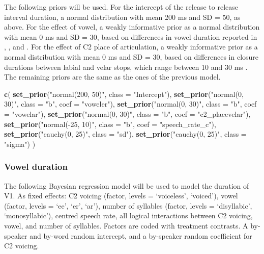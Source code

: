 \documentclass[11pt,]{article}
\newenvironment{Shaded}{\begin{snugshade}}{\end{snugshade}}
\newcommand{\KeywordTok}[1]{\textcolor[rgb]{0.13,0.29,0.53}{\textbf{#1}}}
\newcommand{\DataTypeTok}[1]{\textcolor[rgb]{0.13,0.29,0.53}{#1}}
\newcommand{\StringTok}[1]{\textcolor[rgb]{0.31,0.60,0.02}{#1}}
\newcommand{\NormalTok}[1]{#1}
\begin{document}
The following priors will be used. For the intercept of the release to
release interval duration, a normal distribution with mean 200 ms and SD
= 50, as above. For the effect of vowel, a weakly informative prior as a
normal distribution with mean 0 ms and SD = 30, based on differences in
vowel duration reported in \citet{heffner1937}, \citet{house1953}, and
\citet{hertrich1997}. For the effect of C2 place of articulation, a
weakly informative prior as a normal distribution with mean 0 ms and SD
= 30, based on differences in closure durations between labial and velar
stops, which range between 10 and 30 ms \citep{sharf1962}. The remaining
priors are the same as the ones of the previous model.

\begin{Shaded}
\begin{Highlighting}[]
\KeywordTok{c}\NormalTok{(}
  \KeywordTok{set_prior}\NormalTok{(}\StringTok{"normal(200, 50)"}\NormalTok{, }\DataTypeTok{class =} \StringTok{"Intercept"}\NormalTok{),}
  \KeywordTok{set_prior}\NormalTok{(}\StringTok{"normal(0, 30)"}\NormalTok{, }\DataTypeTok{class =} \StringTok{"b"}\NormalTok{, }\DataTypeTok{coef =} \StringTok{"voweler"}\NormalTok{),}
  \KeywordTok{set_prior}\NormalTok{(}\StringTok{"normal(0, 30)"}\NormalTok{, }\DataTypeTok{class =} \StringTok{"b"}\NormalTok{, }\DataTypeTok{coef =} \StringTok{"vowelar"}\NormalTok{),}
  \KeywordTok{set_prior}\NormalTok{(}\StringTok{"normal(0, 30)"}\NormalTok{, }\DataTypeTok{class =} \StringTok{"b"}\NormalTok{, }\DataTypeTok{coef =} \StringTok{"c2_placevelar"}\NormalTok{),}
  \KeywordTok{set_prior}\NormalTok{(}\StringTok{"normal(-25, 10)"}\NormalTok{, }\DataTypeTok{class =} \StringTok{"b"}\NormalTok{, }\DataTypeTok{coef =} \StringTok{"speech_rate_c"}\NormalTok{),}
  \KeywordTok{set_prior}\NormalTok{(}\StringTok{"cauchy(0, 25)"}\NormalTok{, }\DataTypeTok{class =} \StringTok{"sd"}\NormalTok{),}
  \KeywordTok{set_prior}\NormalTok{(}\StringTok{"cauchy(0, 25)"}\NormalTok{, }\DataTypeTok{class =} \StringTok{"sigma"}\NormalTok{)}
\NormalTok{)}
\end{Highlighting}
\end{Shaded}

\subsubsection{Vowel duration}\label{vowel-duration}

The following Bayesian regression model will be used to model the
duration of V1. As fixed effects: C2 voicing (factor, levels =
`voiceless', `voiced'), vowel (factor, levels = `ee', `er', `ar'),
number of syllables (factor, levels = `disyllabic', `monosyllabic'),
centred speech rate, all logical interactions between C2 voicing, vowel,
and number of syllables. Factors are coded with treatment contrasts. A
by-speaker and by-word random intercept, and a by-speaker random
coefficient for C2 voicing.
\end{document}
